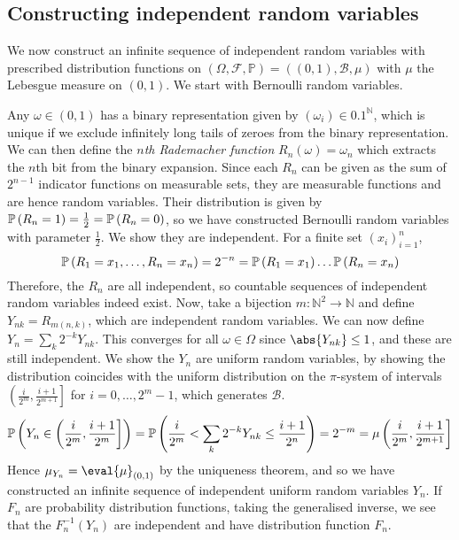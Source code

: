 \subsection{Constructing independent random variables}
We now construct an infinite sequence of independent random variables with prescribed distribution functions on $(\Omega, \mathcal F, \mathbb P) = ((0,1), \mathcal B, \mu)$ with $\mu$ the Lebesgue measure on $(0,1)$.
We start with Bernoulli random variables.

Any $\omega \in (0,1)$ has a binary representation given by $(\omega_i) \in \qty{0,1}^{\mathbb N}$, which is unique if we exclude infinitely long tails of zeroes from the binary representation.
We can then define the \emph{$n$th Rademacher function} $R_n(\omega) = \omega_n$ which extracts the $n$th bit from the binary expansion.
Since each $R_n$ can be given as the sum of $2^{n-1}$ indicator functions on measurable sets, they are measurable functions and are hence random variables.
Their distribution is given by $\mathbb{P}\left({R_n = 1}\right) = \frac{1}{2} = \mathbb{P}\left({R_n = 0}\right)$, so we have constructed Bernoulli random variables with parameter $\frac 12$.
We show they are independent.
For a finite set $(x_i)_{i=1}^n$,
\[ \mathbb{P}\left({R_1 = x_1, \dots, R_n = x_n}\right) = 2^{-n} = \mathbb{P}\left({R_1 = x_1}\right) \dots \mathbb{P}\left({R_n = x_n}\right) \]
Therefore, the $R_n$ are all independent, so countable sequences of independent random variables indeed exist.
Now, take a bijection $m \colon \mathbb N^2 \to \mathbb N$ and define $Y_{nk} = R_{m(n,k)}$, which are independent random variables.
We can now define $Y_n = \sum_k 2^{-k} Y_{nk}$.
This converges for all $\omega \in \Omega$ since $\abs{Y_{nk}} \leq 1$, and these are still independent.
We show the $Y_n$ are uniform random variables, by showing the distribution coincides with the uniform distribution on the $\pi$-system of intervals $\left( \frac{i}{2^m}, \frac{i+1}{2^{m+1}} \right]$ for $i = 0, \dots, 2^m - 1$, which generates $\mathcal B$.
\[ \mathbb{P}\left({Y_n \in \left( \frac{i}{2^m}, \frac{i+1}{2^m} \right]}\right) = \mathbb{P}\left({\frac{i}{2^m} < \sum_k 2^{-k} Y_{nk} \leq \frac{i+1}{2^n}}\right) = 2^{-m} = \mu\left( \frac{i}{2^m}, \frac{i+1}{2^{m+1}} \right] \]
Hence $\mu_{Y_n} = \eval{\mu}_{(0,1)}$ by the uniqueness theorem, and so we have constructed an infinite sequence of independent uniform random variables $Y_n$.
If $F_n$ are probability distribution functions, taking the generalised inverse, we see that the $F_n^{-1}(Y_n)$ are independent and have distribution function $F_n$.

